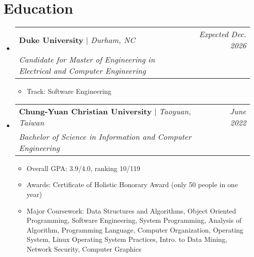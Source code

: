 \documentclass[letterpaper,11pt]{article}
\makeatletter
\newcommand{\subheadingtitlevspace}{
\vspace{-3pt}
}
\newcommand{\resumeItem}[1]{
  \item{
    {#1}\vspace{-4pt}
  }
}
\newcommand{\resumeSubheading}[4]{
   \item
     \begin{tabular*}{0.97\textwidth}[t]{l@{\extracolsep{\fill}}r}
       \textbf{#1} | \emph{#2} & \textit{#4}\\
       \textit{#3} \\
     \end{tabular*}\vspace{-8pt}
 }
\newcommand{\resumeSubHeadingListStart}{\subheadingtitlevspace\begin{itemize}[leftmargin=0in, label={}]}
\newcommand{\resumeSubHeadingListEnd}{\end{itemize}}
\newcommand{\resumeItemListStart}{
\begin{itemize}[label={$\bullet$}, labelsep=8pt, itemsep=4pt]}
\newcommand{\resumeItemListEnd}{
\end{itemize}\vspace{-8pt}}
\makeatother
\begin{document}


\section{Education}
  \resumeSubHeadingListStart
    \resumeSubheading
      {Duke University}{Durham, NC}
      {Candidate for Master of Engineering in Electrical and Computer Engineering} 
      {Expected Dec. 2026} %
      \resumeItemListStart
        \resumeItem{Track: Software Engineering}
      \resumeItemListEnd
    \resumeSubheading
      {Chung-Yuan Christian University} {Taoyuan, Taiwan}
      {Bachelor of Science in Information and Computer Engineering} 
      {June 2022}
      \resumeItemListStart
        \resumeItem{Overall GPA: 3.9/4.0, ranking 10/119}
        \resumeItem{Awards: Certificate of Holistic Honorary Award (only 50 people in one year)}
        \resumeItem{Major Coursework: Data Structures and Algorithms, Object Oriented Programming, Software Engineering, System Programming, 
                    Analysis of Algorithm, Programming Language, Computer Organization, Operating System, Linux Operating System Practices, 
                    Intro. to Data Mining, Network Security, Computer Graphics} 
      \resumeItemListEnd
  \resumeSubHeadingListEnd

   
\end{document}
